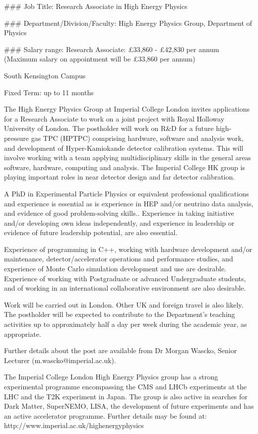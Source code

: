 ### Job Title:
Research Associate in High Energy Physics

### Department/Division/Faculty:
High Energy Physics Group, Department of Physics

### Salary range:
Research Associate: £33,860 - £42,830 per annum (Maximum salary on appointment will be £33,860 per annum)

South Kensington Campus
 
Fixed Term: up to 11 months
 
The High Energy Physics Group at Imperial College London invites applications for a Research Associate to work on a joint project with Royal 
Holloway University of London. The postholder will work on R&D for a future high-pressure gas TPC (HPTPC) comprising hardware, software and 
analysis work, and development of Hyper-Kamiokande detector calibration systems. This will involve working with a team applying 
multidisciplinary skills in the general areas software, hardware, computing and analysis. The Imperial College HK group is playing important 
roles in near detector design and far detector calibration.
 
A PhD in Experimental Particle Physics or equivalent professional qualifications and experience is essential as is experience in HEP and/or 
neutrino data analysis, and evidence of good problem-solving skills.. Experience in taking initiative and/or developing own ideas 
independently, and experience in leadership or evidence of future leadership potential, are also essential.
 
Experience of programming in C++, working with hardware development and/or maintenance, detector/accelerator operations and performance 
studies, and experience of Monte Carlo simulation development and use are desirable. Experience of working with Postgraduate or advanced 
Undergraduate students, and of working in an international collaborative environment are also desirable.
 
Work will be carried out in London. Other UK and foreign travel is also likely. The postholder will be expected to contribute to the 
Department's teaching activities up to approximately half a day per week during the academic year, as appropriate.
 
Further details about the post are available from Dr Morgan Wascko, Senior Lecturer (m.wascko@imperial.ac.uk).
 
The Imperial College London High Energy Physics group has a strong experimental programme encompassing the CMS and LHCb experiments at the LHC 
and the T2K experiment in Japan.  The group is also active in searches for Dark Matter, SuperNEMO, LISA, the development of future experiments 
and has an active accelerator programme. Further details may be found at: http://www.imperial.ac.uk/highenergyphysics

